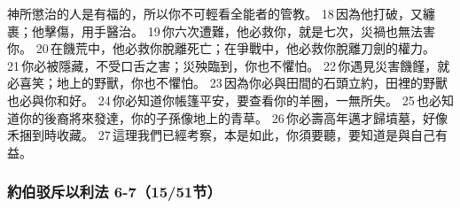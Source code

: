 神所懲治的人是有福的，所以你不可輕看全能者的管教。 18 因為他打破，又纏裹；他擊傷，用手醫治。 19 你六次遭難，他必救你，就是七次，災禍也無法害你。 20 在饑荒中，他必救你脫離死亡；在爭戰中，他必救你脫離刀劍的權力。 21 你必被隱藏，不受口舌之害；災殃臨到，你也不懼怕。 22 你遇見災害饑饉，就必喜笑；地上的野獸，你也不懼怕。 23 因為你必與田間的石頭立約，田裡的野獸也必與你和好。 24 你必知道你帳篷平安，要查看你的羊圈，一無所失。 25 也必知道你的後裔將來發達，你的子孫像地上的青草。 26 你必壽高年邁才歸墳墓，好像禾捆到時收藏。 27 這理我們已經考察，本是如此，你須要聽，要知道是與自己有益。


\subsubsection{約伯驳斥以利法 6-7（15/51节）}
